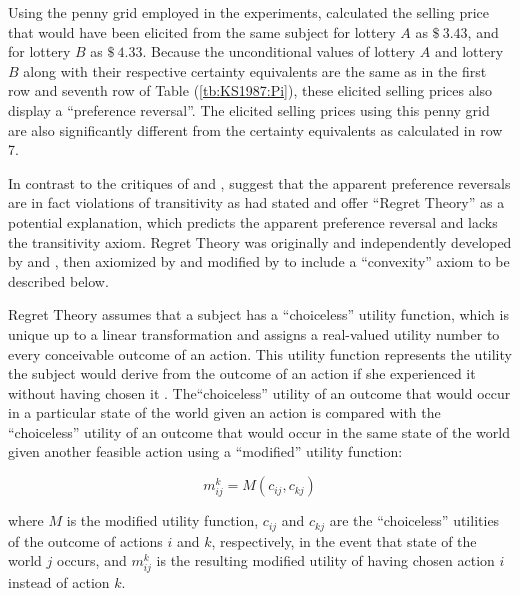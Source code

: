 \documentclass[11pt,a4paper]{report}
\newcommand{\money}[1]{$\$\!\:#1$}          %
\begin{document}
Using the penny grid employed in the \textcite{Grether1979} experiments, \textcite[680]{Karni1987} calculated the selling price that would have been elicited from the same subject for lottery $A$ as \money{3.43}, and for lottery $B$ as \money{4.33}.
Because the unconditional values of lottery $A$ and lottery $B$ along with their respective certainty equivalents are the same as in the first row and seventh row of Table (\ref{tb:KS1987:Pi}), these elicited selling prices also display a \enquote{preference reversal}.
The elicited selling prices using this penny grid are also significantly different from the certainty equivalents as calculated in row 7.

In contrast to the critiques of \textcite{Holt1986} and \textcite{Karni1987}, \textcite{Loomes1989} suggest that the apparent preference reversals are in fact violations of transitivity as \textcite[623]{Grether1979} had stated and offer \enquote{Regret Theory} as a potential explanation, which predicts the apparent preference reversal and lacks the transitivity axiom.
Regret Theory was originally and independently developed by \textcite{Loomes1982} and \textcite{Bell1982}, then axiomized by \textcite{Fishburn1987} and modified by \textcite{Loomes1987} to include a \enquote{convexity} axiom to be described below.

Regret Theory assumes that a subject has a \enquote{choiceless} utility function, which is unique up to a linear transformation and assigns a real-valued utility number to every conceivable outcome of an action.
This utility function represents the utility the subject would derive from the outcome of an action if she experienced it without having chosen it \textcite[807]{Loomes1987}.
The\enquote{choiceless} utility of an outcome that would occur in a particular state of the world given an action is compared with the \enquote{choiceless} utility of an outcome that would occur in the same state of the world given another feasible action using a \enquote{modified} utility function:

\begin{equation}
	\label{eq:LS1987:mu}
	m^k_{ij} = M( c_{ij} , c_{kj} )
\end{equation}

\noindent where $M$ is the modified utility function, $c_{ij}$ and $c_{kj}$ are the \enquote{choiceless} utilities of the outcome of actions $i$ and $k$, respectively, in the event that state of the world $j$ occurs, and $m^k_{ij}$ is the resulting modified utility of having chosen action $i$ instead of action $k$.
\end{document}
